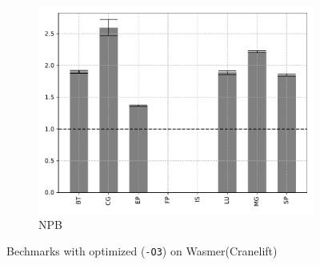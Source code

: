 \begin{figure}
\begin{subfigure}[t]{.45\textwidth}
        \includegraphics[width=\textwidth]
        {Images/6.1.RQ1/npb-wasmer-cranelift-opt.pdf}
        \caption{NPB}
    \end{subfigure}
    \caption{Bechmarks with optimized (\texttt{-O3}) on Wasmer(Cranelift)}
    \label{fig:rq1-wamer-cranelift-opt}
\end{figure}

